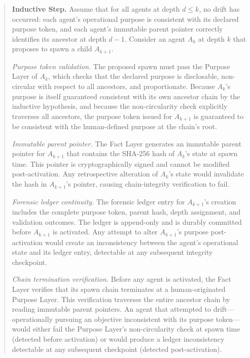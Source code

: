 \begin{quotation}
\textbf{Inductive Step.} Assume that for all agents at depth $d \leq k$, no drift has occurred: each agent's operational purpose is consistent with its declared purpose token, and each agent's immutable parent pointer correctly identifies its ancestor at depth $d-1$. Consider an agent $A_k$ at depth $k$ that proposes to spawn a child $A_{k+1}$.

\textit{Purpose token validation.} The proposed spawn must pass the Purpose Layer of $A_k$, which checks that the declared purpose is disclosable, non-circular with respect to all ancestors, and proportionate. Because $A_k$'s purpose is itself guaranteed consistent with its own ancestor chain by the inductive hypothesis, and because the non-circularity check explicitly traverses all ancestors, the purpose token issued for $A_{k+1}$ is guaranteed to be consistent with the human-defined purpose at the chain's root.

\textit{Immutable parent pointer.} The Fact Layer generates an immutable parent pointer for $A_{k+1}$ that contains the SHA-256 hash of $A_k$'s state at spawn time. This pointer is cryptographically signed and cannot be modified post-activation. Any retrospective alteration of $A_k$'s state would invalidate the hash in $A_{k+1}$'s pointer, causing chain-integrity verification to fail.

\textit{Forensic ledger continuity.} The forensic ledger entry for $A_{k+1}$'s creation includes the complete purpose token, parent hash, depth assignment, and validation outcomes. The ledger is append-only and is durably committed before $A_{k+1}$ is activated. Any attempt to alter $A_{k+1}$'s purpose post-activation would create an inconsistency between the agent's operational state and its ledger entry, detectable at any subsequent integrity checkpoint.

\textit{Chain termination verification.} Before any agent is activated, the Fact Layer verifies that its spawn chain terminates at a human-originated Purpose Layer. This verification traverses the entire ancestor chain by reading immutable parent pointers. An agent that attempted to drift—operationally pursuing an objective inconsistent with its purpose token—would either fail the Purpose Layer's non-circularity check at spawn time (detected before activation) or would produce a ledger inconsistency detectable at any subsequent checkpoint (detected post-activation).

\end{quotation}

